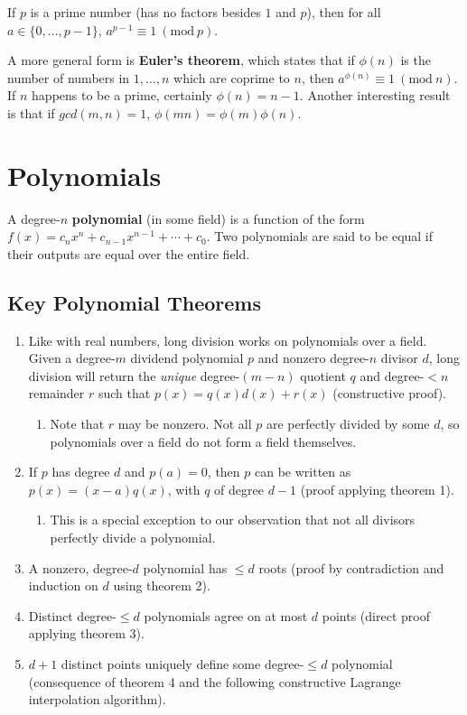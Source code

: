 \documentclass[12pt]{article}
\begin{document}
If $p$ is a prime number (has no factors besides $1$ and $p$), then for all $a \in \{ 0, \ldots, p - 1 \}$, $a^{p - 1} \equiv 1\ (\mathrm{mod}\ p)$.

A more general form is \textbf{Euler's theorem}, which states that if $\phi(n)$ is the number of numbers in $1, \ldots, n$ which are coprime to $n$, then $a^{\phi(n)} \equiv 1\ (\mathrm{mod}\ n)$. If $n$ happens to be a prime, certainly $\phi(n) = n - 1$. Another interesting result is that if $gcd(m, n) = 1$, $\phi(mn) = \phi(m) \phi(n)$.

\section{Polynomials}

A degree-$n$ \textbf{polynomial} (in some field) is a function of the form $f(x) = c_n x^n + c_{n - 1} x^{n - 1} + \cdots + c_0$. Two polynomials are said to be equal if their outputs are equal over the entire field.

\subsection{Key Polynomial Theorems}

\begin{enumerate}
\item Like with real numbers, long division works on polynomials over a field. Given a degree-$m$ dividend polynomial $p$ and nonzero degree-$n$ divisor $d$, long division will return the \emph{unique} degree-$(m - n)$ quotient $q$ and degree-$< n$ remainder $r$ such that $p(x) = q(x)d(x) + r(x)$ (constructive proof).
\begin{enumerate}
\item Note that $r$ may be nonzero. Not all $p$ are perfectly divided by some $d$, so polynomials over a field do not form a field themselves.
\end{enumerate}
\item If $p$ has degree $d$ and $p(a) = 0$, then $p$ can be written as $p(x) = (x - a) q(x)$, with $q$ of degree $d - 1$ (proof applying theorem 1).
\begin{enumerate}
\item This is a special exception to our observation that not all divisors perfectly divide a polynomial.
\end{enumerate}
\item A nonzero, degree-$d$ polynomial has $\leq d$ roots (proof by contradiction and induction on $d$ using theorem 2).
\item Distinct degree-$\leq d$ polynomials agree on at most $d$ points (direct proof applying theorem 3).
\item $d + 1$ distinct points uniquely define some degree-$\leq d$ polynomial (consequence of theorem 4 and the following constructive Lagrange interpolation algorithm).
\end{enumerate}
\end{document}

